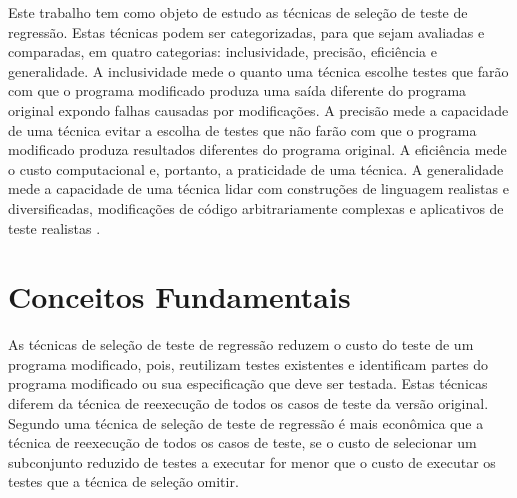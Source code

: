 Este trabalho tem como objeto de estudo as técnicas de seleção de teste de regressão. Estas técnicas podem ser categorizadas, para que sejam avaliadas e comparadas, em quatro categorias: inclusividade, precisão, eficiência e generalidade. A inclusividade mede o quanto uma técnica escolhe testes que farão com que o programa modificado produza uma saída diferente do programa original expondo falhas causadas por modificações. A precisão mede a capacidade de uma técnica evitar a escolha de testes que não farão com que o programa modificado produza resultados diferentes do programa original. A eficiência mede o custo computacional e, portanto, a praticidade de uma técnica. A generalidade mede a capacidade de uma técnica lidar com construções de linguagem realistas e diversificadas, modificações de código arbitrariamente complexas e aplicativos de teste realistas \cite{536955}.

\section{Conceitos Fundamentais}

As técnicas de seleção de teste de regressão reduzem o custo do teste de um programa modificado, pois, reutilizam testes existentes e identificam partes do programa modificado ou sua especificação que deve ser testada. Estas técnicas diferem da técnica de reexecução de todos os casos de teste da versão original. Segundo  uma técnica de seleção de teste de regressão é mais econômica que a técnica de reexecução de todos os casos de teste, se o custo de selecionar um subconjunto reduzido de testes a executar for menor que o custo de executar os testes que a técnica de seleção omitir.
